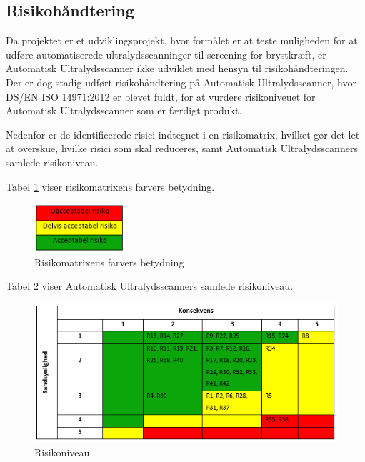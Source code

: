 \subsection{Risikohåndtering}
Da projektet er et udviklingsprojekt, hvor formålet er at teste muligheden for at udføre automatiserede ultralydsscanninger til screening for brystkræft, er Automatisk Ultralydsscanner ikke udviklet med hensyn til risikohåndteringen. Der er dog stadig udført risikohåndtering på Automatisk Ultralydsscanner, hvor DS/EN ISO 14971:2012 er blevet fuldt, for at vurdere risikoniveuet for Automatisk Ultralydsscanner som er færdigt produkt. 

Nedenfor er de identificerede risici indtegnet i en risikomatrix, hvilket gør det let at overskue, hvilke risici som skal reduceres, samt Automatisk Ultralydsscanners samlede risikoniveau.  

Tabel \ref{Niveau} viser risikomatrixens farvers betydning. 

\begin{figure}[H]
    \centering
    \includegraphics[width=0.30\textwidth]{figurer/r/Niveau}
    \caption{Risikomatrixens farvers betydning}
    \label{Niveau}
\end{figure}

Tabel \ref{Risiko} viser Automatisk Ultralydsscanners samlede risikoniveau. 

\begin{figure}[H]
    \centering
    \includegraphics[width=1\textwidth]{figurer/r/Risiko}
    \caption{Risikoniveau}
    \label{Risiko}
\end{figure}

